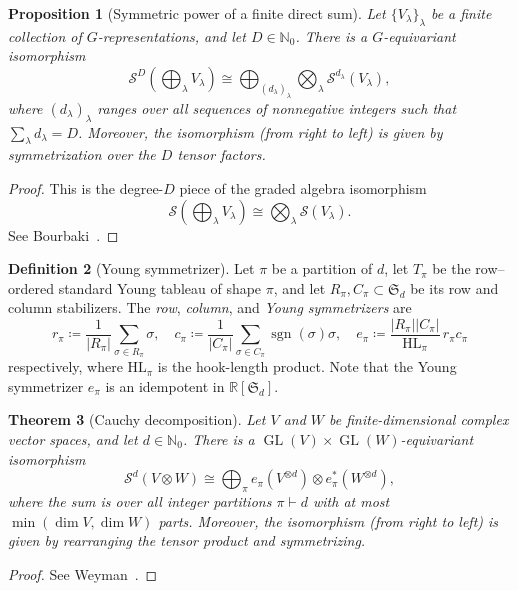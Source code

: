 \documentclass[11pt]{article}
\newcommand{\dsN}{\mathbb{N}}
\newcommand{\dsR}{\mathbb{R}}
\newcommand{\scS}{\mathcal{S}}
\newcommand{\GL}{\operatorname{GL}}
\newtheorem{theorem}{Theorem}[section]
\newtheorem{proposition}[theorem]{Proposition}
\theoremstyle{definition}
\newtheorem{definition}[theorem]{Definition}
\begin{document}
\begin{proposition}[Symmetric power of a finite direct sum]\label{prop:sym-direct-sum}
  Let $\{V_\lambda\}_\lambda$ be a finite collection of $G$-representations, and let $D\in\dsN_0$. There is a $G$-equivariant isomorphism
  \[
    \scS^D\!\left(\bigoplus_\lambda V_\lambda\right)
    \cong
    \bigoplus_{(d_\lambda)_\lambda}\bigotimes_\lambda \scS^{d_\lambda}(V_\lambda),
  \]
  where $(d_\lambda)_\lambda$ ranges over all sequences of nonnegative integers such that $\sum_\lambda d_\lambda=D$. Moreover, the isomorphism (from right to left) is given by symmetrization over the $D$ tensor factors.
\end{proposition}
\begin{proof}
  This is the degree-$D$ piece of the graded algebra isomorphism
  \[
    \scS\!\left(\bigoplus_\lambda V_\lambda\right)
    \cong
    \bigotimes_\lambda \scS(V_\lambda).
  \]
  See Bourbaki~\cite[Chapter III, \S6.6, Proposition 9]{Bourbaki1989}.
\end{proof}

\begin{definition}[Young symmetrizer]\label{def:young-symmetrizer}
  Let $\pi$ be a partition of $d$, let $T_\pi$ be the row--ordered standard Young tableau of shape $\pi$, and let $R_\pi,C_\pi\subset \mathfrak{S}_d$ be its row and column stabilizers. The \emph{row}, \emph{column}, and \emph{Young symmetrizers} are
  \[
    r_\pi\coloneq \frac{1}{|R_\pi|}\sum_{\sigma\in R_\pi}\sigma,
    \quad
    c_\pi\coloneq \frac{1}{|C_\pi|}\sum_{\sigma\in C_\pi}\operatorname{sgn}(\sigma)\sigma,
    \quad
    e_\pi\coloneq \frac{|R_\pi||C_\pi|}{\mathrm{HL}_\pi}\,r_\pi c_\pi
  \]
  respectively, where $\mathrm{HL}_\pi$ is the hook-length product. Note that the Young symmetrizer $e_\pi$ is an idempotent in $\dsR[\mathfrak{S}_d]$.
\end{definition}

\begin{theorem}[Cauchy decomposition]\label{thm:cauchy}
  Let $V$ and $W$ be finite-dimensional complex vector spaces, and let $d \in \dsN_0$. There is a $\GL(V)\times \GL(W)$-equivariant isomorphism
  \begin{equation}\label{eq:cauchy}
    \scS^d(V\otimes W)
    \cong
    \bigoplus_\pi
    e_\pi(V^{\otimes d})\otimes e_\pi^*(W^{\otimes d}),
  \end{equation}
  where the sum is over all integer partitions $\pi\vdash d$ with at most $\min(\dim V,\dim W)$ parts. Moreover, the isomorphism (from right to left) is given by rearranging the tensor product and symmetrizing.
\end{theorem}
\begin{proof}
  See Weyman~\cite[\S2.3, Corollary 2.3.3]{Weyman2003}.
\end{proof}
\end{document}
